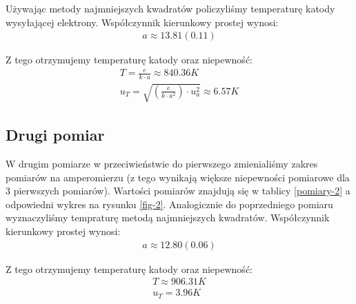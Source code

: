 \documentclass[a4paper]{article}
\newlength{\du}
\begin{document}
Używając metody najmniejszych kwadratów policzyliśmy temperaturę katody wysyłającej elektrony. Współczynnik kierunkowy prostej wynosi:
\begin{align*}
a \approx 13.81 (0.11)
\end{align*}

Z tego otrzymujemy temperaturę katody oraz niepewność:
\begin{align*}
T = \frac{e}{k \cdot a} \approx 840.36 K \\
u_{T} = \sqrt{(\frac{e}{k \cdot a^2}) \cdot u_{a}^2} \approx 6.57 K
\end{align*}





\subsection{Drugi pomiar}
W drugim pomiarze w przeciwieństwie do pierwszego zmienialiśmy zakres pomiarów na amperomierzu
(z tego wynikają większe niepewności pomiarowe dla 3 pierwszych pomiarów).
Wartości pomiarów znajdują się w tablicy \ref{pomiary-2} a odpowiedni wykres na rysunku \ref{fig-2}.
Analogicznie do poprzedniego pomiaru wyznaczyliśmy tempraturę metodą najmniejszych kwadratów.
Współczynnik kierunkowy prostej wynosi:
\begin{align*}
a \approx 12.80 (0.06)
\end{align*}

Z tego otrzymujemy temperaturę katody oraz niepewność:
\begin{align*}
T \approx 906.31 K \\
u_{T} = 3.96 K
\end{align*}
\end{document}
